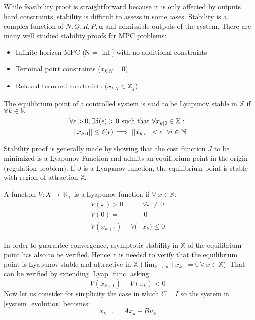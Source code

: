 While feasibility proof is straightforward because it is only affected by outputs hard constraints, stability is difficult to assess in some cases.
Stability is a complex function of $N, Q, R, P, \mathbf{u}$ and admissible outputs of the system.
There are many well studied stability proofs for MPC problems:

\begin{itemize}
\item Infinite horizon MPC (N = $\inf$) with no additional constraints
\item Terminal point constraints ($x_{k|N}=0$)
\item Relaxed terminal constraints ($x_{k|N} \in \mathbb{X}_f $)
\end{itemize}

The equilibrium point of a controlled system is said to be Lyapunov stable in $\mathbb{X}$ if $\forall k \in \mathbb{N}$
\begin{equation}
\begin{split}
\forall& \epsilon > 0, \exists \delta(\epsilon) >0 \textnormal{ such that } \forall x_{k|0} \in \mathbb{X}: \\
&||x_{k|0}|| \leq \delta(\epsilon) \implies ||x_{k|i}|| < \epsilon \ \ \forall i \in \mathbb{N}
\end{split}
\end{equation}

Stability proof is generally made by showing that the cost function $J$ to be minimized is a Lyapunov Function and admits an equilibrium point in the origin (regulation problem). If $J$ is a Lyapunov function, the equilibrium point is stable with region of attraction $\mathbb{X}$.

A function $V:X\rightarrow\ \mathbb{R}_+$ is a Lyapunov function if $\forall\ x \in \mathbb{X}$:
\begin{equation} \label{Lyap_func}
\begin{split}
	V(x)>0 \ \ & \forall x \neq 0 \\
	V(0)=&\ 0 \\
	V(x_{k+1})-V(&x_{k}) \leq 0
\end{split}
\end{equation}

In order to guarantee convergence, asymptotic stability in $\mathbb{X}$ of the equilibrium point has also to be verified. Hence it is needed to verify that the equilibrium point is Lyapunov stable and attractive in $\mathbb{X}$ ($\lim_{k \to \infty}||x_k||=0\ \forall\ x \in \mathbb{X}$). 
That can be verified by extending \ref{Lyap_func} asking: 
\begin{equation}
	V(x_{k+1})-V(x_{k}) < 0
\end{equation} 
Now let us consider for simplicity the case in which $C=I$ so the system in \ref{system_evolution} becomes:
\begin{equation*}
x_{k+1}=Ax_k+Bu_k
\end{equation*}

